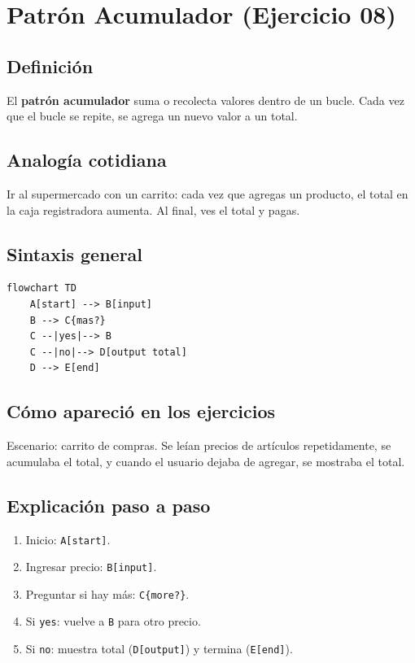 \documentclass[12pt]{article}
\begin{document}
\newpage

\section{Patrón Acumulador (Ejercicio 08)}

\subsection{Definición}

El \textbf{patrón acumulador} suma o recolecta valores dentro de un bucle. Cada vez que el bucle se repite, se agrega un nuevo valor a un total.

\subsection{Analogía cotidiana}

Ir al supermercado con un carrito: cada vez que agregas un producto, el total en la caja registradora aumenta. Al final, ves el total y pagas.

\subsection{Sintaxis general}

\begin{lstlisting}[style=mermaidstyle]
flowchart TD
    A[start] --> B[input]
    B --> C{mas?}
    C --|yes|--> B
    C --|no|--> D[output total]
    D --> E[end]
\end{lstlisting}

\subsection{Cómo apareció en los ejercicios}

Escenario: carrito de compras. Se leían precios de artículos repetidamente, se acumulaba el total, y cuando el usuario dejaba de agregar, se mostraba el total.

\subsection{Explicación paso a paso}

\begin{enumerate}
    \item Inicio: \texttt{A[start]}.
    \item Ingresar precio: \texttt{B[input]}.
    \item Preguntar si hay más: \texttt{C\{more?\}}.
    \item Si \texttt{yes}: vuelve a \texttt{B} para otro precio.
    \item Si \texttt{no}: muestra total (\texttt{D[output]}) y termina (\texttt{E[end]}).
\end{enumerate}
\end{document}
